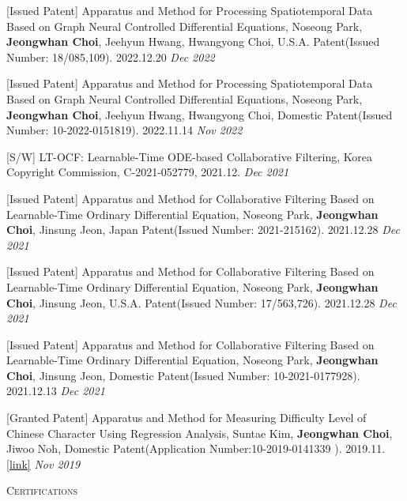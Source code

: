 \documentclass[10pt]{article}
\newenvironment{changemargin}[2]{
  \begin{list}{}{
    \setlength{\topsep}{0pt}
    \setlength{\leftmargin}{#1}
    \setlength{\rightmargin}{#2}
    \setlength{\listparindent}{\parindent}
    \setlength{\itemindent}{\parindent}
    \setlength{\parsep}{\parskip}
  }
  \item[]}{\end{list}
}
\newcommand{\lineover}{
	\begin{changemargin}{-0.05in}{-0.05in}
		\vspace*{-8pt}
		\hrulefill \\
		\vspace*{-2pt}
	\end{changemargin}
}
\newcommand{\header}[1]{
	\begin{changemargin}{-0.5in}{-0.5in}
		\scshape{#1}\\
  	\lineover
	\end{changemargin}
}
\newcommand{\presentation}[2]{
	{#1} \hfill \emph{#2}\\ \bigskip
}
\newenvironment{body} {
	\vspace*{-16pt}
	\begin{changemargin}{-0.25in}{-0.5in}
  }
	{\end{changemargin}
}
\begin{document}
\begin{body}
	\vspace{14pt}
	
\presentation{[Issued Patent] Apparatus and Method for Processing Spatiotemporal Data Based on Graph Neural Controlled Differential Equations, Noseong Park, \textbf{Jeongwhan Choi}, Jeehyun Hwang, Hwangyong Choi, U.S.A. Patent(Issued Number: 18/085,109). 2022.12.20}{Dec 2022}	
\presentation{[Issued Patent] Apparatus and Method for Processing Spatiotemporal Data Based on Graph Neural Controlled Differential Equations, Noseong Park, \textbf{Jeongwhan Choi}, Jeehyun Hwang, Hwangyong Choi, Domestic Patent(Issued Number: 10-2022-0151819). 2022.11.14}{Nov 2022}	
\presentation{[S/W] LT-OCF: Learnable-Time ODE-based Collaborative Filtering, Korea Copyright Commission, C-2021-052779, 2021.12.}{Dec 2021}	
\presentation{[Issued Patent] Apparatus and Method for Collaborative Filtering Based on Learnable-Time Ordinary Differential Equation, Noseong Park, \textbf{Jeongwhan Choi}, Jinsung Jeon, Japan Patent(Issued Number: 2021-215162). 2021.12.28}{Dec 2021}	
\presentation{[Issued Patent] Apparatus and Method for Collaborative Filtering Based on Learnable-Time Ordinary Differential Equation, Noseong Park, \textbf{Jeongwhan Choi}, Jinsung Jeon, U.S.A. Patent(Issued Number: 	17/563,726). 2021.12.28}{Dec 2021}	
\presentation{[Issued Patent] Apparatus and Method for Collaborative Filtering Based on Learnable-Time Ordinary Differential Equation, Noseong Park, \textbf{Jeongwhan Choi}, Jinsung Jeon, Domestic Patent(Issued Number: 10-2021-0177928). 2021.12.13}{Dec 2021}	
\presentation{[Granted Patent] Apparatus and Method for Measuring Difficulty Level of Chinese Character Using Regression Analysis, Suntae Kim, \textbf{Jeongwhan Choi}, Jiwoo Noh, Domestic Patent(Application Number:10-2019-0141339 ). 2019.11. \href{https://doi.org/10.8080/1020190141339}{[link]}}{Nov 2019}	
  
\end{body}
    
\medskip


\header{Certifications}
\end{document}
